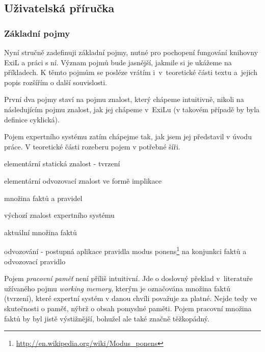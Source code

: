 \subsection{Uživatelská příručka}
\subsubsection{Základní pojmy}

Nyní stručně zadefinuji základní pojmy, nutné pro pochopení fungování knihovny
ExiL a práci s ní. Význam pojmů bude jasnější, jakmile si je ukážeme na
příkladech. K těmto pojmům se posléze vrátím i~v~teoretické části textu
a~jejich popis rozšířím o další souvislosti.

První dva pojmy staví na pojmu znalost, který chápeme intuitivně, nikoli na
následujícím pojmu znalost, jak jej chápeme v~ExiLu (v takovém případě by byla
definice cyklická).

Pojem expertního systému zatím chápejme tak, jak jsem jej představil v úvodu
práce. V teoretické části rozeberu pojem v potřebné šíři.
\begin{description}[leftmargin=5cm,style=sameline,align=right,labelsep=0.5cm]
  \item[fakt] elementární statická znalost - tvrzení
  \item[(odvozovací) pravidlo] elementární odvozovací znalost ve formě implikace
  \item[znalost (v ExiLu)] množina faktů a pravidel
  \item[znalostní báze] výchozí znalost expertního systému
  \item[pracovní paměť] aktuální množina faktů
  \item[inference] odvozování - postupná aplikace pravidla modus
    ponens\footnote{\url{http://en.wikipedia.org/wiki/Modus\_ponens}} na
    konjunkci faktů a odvozovací pravidlo
\end{description}
Pojem \emph{pracovní paměť} není příliš intuitivní. Jde o doslovný překlad
v~literatuře užívaného pojmu \emph{working memory}, kterým je označována množina
faktů (tvrzení), které expertní systém v danou chvíli považuje za platné. Nejde
tedy ve skutečnosti o paměť, nýbrž o obsah pomyslné paměti. Pojem pracovní
množina faktů by byl jistě výstižnější, bohužel ale také značně těžkopádný.













